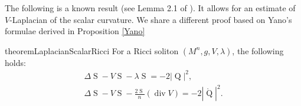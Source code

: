 \documentclass{amsart}
\newcommand{\abs}[1]{\left| #1 \right|}
\DeclareMathOperator*{\Qricci}{Q}
\DeclareMathOperator*{\scalar}{S}
\DeclareMathOperator*{\divergence}{div}
\theoremstyle{plain}
\theoremstyle{plain}
\theoremstyle{plain}
\theoremstyle{plain}
\theoremstyle{remark}
\begin{document}
The following is a known result (see Lemma 2.1 of \cite{MR3063556}). It allows for an estimate of $V$-Laplacian of the scalar curvature. We share a different proof based on Yano's formulae derived in Proposition \ref{Yano}
\begin{restatable}{theorem}{LaplacianScalarRicci}
	\label{prop: laplacian Scalar in norm ricci}
    For a Ricci soliton $(M^n,g,V,\lambda)$, the following holds:
    \begin{gather}
        \Delta\scalar - V\scalar - \lambda\scalar = - 2\abs{\Qricci}^2,   \label{eqn: laplacian Scalar in norm ricci} \\
        \Delta\scalar - V\scalar - \frac{2\scalar}{n} \left( \divergence V \right) 
            = -2 \abs{\mathring{\Qricci}}^2 .\label{eqn: laplacian Scalar in traceless ricci}
    \end{gather}
\end{restatable}



\end{document}
